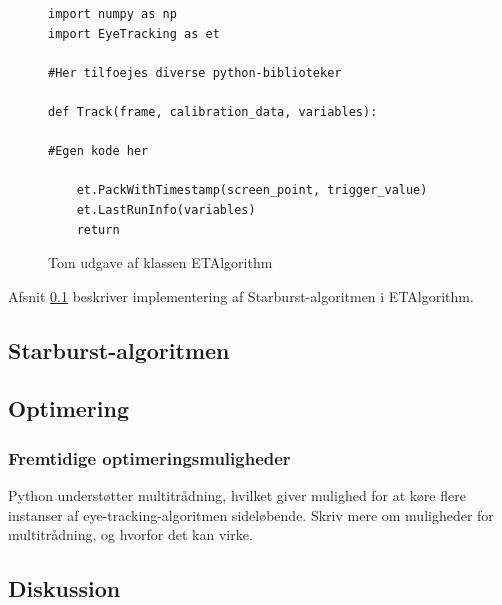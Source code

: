 \documentclass[rapport.tex]{subfiles}
\begin{document}
\begin{figure}
	\caption{Tom udgave af klassen ETAlgorithm}
	\label{list:emptyalg}
\begin{lstlisting}
import numpy as np
import EyeTracking as et

#Her tilfoejes diverse python-biblioteker

def Track(frame, calibration_data, variables):

#Egen kode her 

	et.PackWithTimestamp(screen_point, trigger_value)
	et.LastRunInfo(variables)
	return
\end{lstlisting}
\end{figure}

	
	
	Afsnit \ref{StarburstImpl} beskriver implementering af Starburst-algoritmen i ETAlgorithm.
	\subsection{Starburst-algoritmen}
	\label{StarburstImpl}
	\subsection{Optimering}
	
	\subsubsection{Fremtidige optimeringsmuligheder}
	Python understøtter multitrådning, hvilket giver mulighed for at køre flere instanser af eye-tracking-algoritmen sideløbende. Skriv mere om muligheder for multitrådning, og hvorfor det kan virke.
	\subsection{Diskussion}
		
\end{document}
